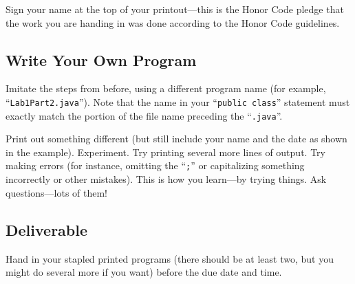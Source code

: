 Sign your name at the top of your printout---this is the Honor Code pledge that the work you are handing in was done
according to the Honor Code guidelines.

\subsection*{Write Your Own Program}

Imitate the steps from before, using a different program name (for example, ``{\tt Lab1Part2.java}''). Note that the
name in your ``{\tt public class}'' statement must exactly match the portion of the file name preceding the ``{\tt .java}''.

Print out something different (but still include your name and the date as shown in the example). Experiment. Try
printing several more lines of output.  Try making errors (for instance, omitting the ``{\tt ;}'' or capitalizing
  something incorrectly or other mistakes). This is how you learn---by trying things. Ask questions---lots of them! 

\subsection*{Deliverable}

Hand in your stapled printed programs (there should be at least two, but you might do several more if you want) before
the due date and time. 

       

